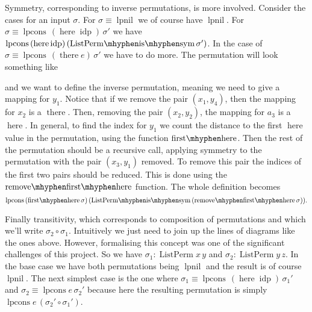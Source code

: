 \documentclass[12pt, parskip, DIV=14]{scrbook}
\renewcommand{\circ}{\vysmwhtcircle}
\newcommand{\idp}{\operatorname{idp}}
\newcommand{\here}{\operatorname{here}}
\newcommand{\there}{\operatorname{there}}
\newcommand{\firsthere}{\operatorname{first\mhyphen here}}
\newcommand{\remfirsthere}{\operatorname{remove\mhyphen first\mhyphen here}}
\newcommand{\ListPerm}{\operatorname{ListPerm}}
\newcommand{\lpnil}{\operatorname{lpnil}}
\newcommand{\lpcons}{\operatorname{lpcons}}
\begin{document}
Symmetry, corresponding to inverse permutations, is more involved. Consider the cases for an input $\sigma$. For $\sigma \equiv \lpnil$ we of course have $\lpnil$. For $\sigma \equiv \lpcons\,(\here \idp)\,\sigma'$ we have $\lpcons\,(\here \idp)\,(\mathrm{ListPerm\mhyphen is\mhyphen sym}\,\sigma')$. In the case of $\sigma \equiv \lpcons\,(\there e)\,\sigma'$ we have to do more. The permutation will look something like
\begin{center}
\end{center}
and we want to define the inverse permutation, meaning we need to give a mapping for $y_1$. Notice that if we remove the pair $(x_1 , y_4)$, then the mapping for $x_2$ is a $\there$. Then, removing the pair $(x_2 , y_2)$, the mapping for $a_3$ is a $\here$. In general, to find the index for $y_1$ we count the distance to the first $\here$ value in the permutation, using the function $\firsthere$. Then the rest of the permutation should be a recursive call, applying symmetry to the permutation with the pair $(x_3 , y_1)$ removed. To remove this pair the indices of the first two pairs should be reduced. This is done using the $\remfirsthere$ function. The whole definition becomes $$\lpcons\,(\firsthere \sigma)\,(\mathrm{ListPerm\mhyphen is\mhyphen sym}\,(\remfirsthere \sigma)).$$

Finally transitivity, which corresponds to composition of permutations and which we'll write $\sigma_2 \circ \sigma_1$. Intuitively we just need to join up the lines of diagrams like the ones above. However, formalising this concept was one of the significant challenges of this project. So we have $\sigma_1 : \ListPerm x\,y$ and $\sigma_2 : \ListPerm y\,z$. In the base case we have both permutations being $\lpnil$ and the result is of course $\lpnil$. The next simplest case is the one where $\sigma_1 \equiv \lpcons\,(\here \idp)\,\sigma_1'$ and $\sigma_2 \equiv \lpcons e\,\sigma_2'$ because here the resulting permutation is simply $\lpcons e\,(\sigma_2' \circ \sigma_1')$.
\end{document}
